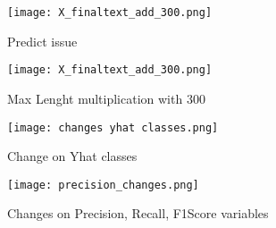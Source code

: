 \begin{figure}[H]
    \centering
    \texttt{[image: X\_finaltext\_add\_300.png]}
    \caption{Predict issue}
    \label{fig:error_dimentionality}
\end{figure}

\begin{figure}[H]
    \centering
    \texttt{[image: X\_finaltext\_add\_300.png]}
    \caption{Max Lenght multiplication with 300}
    \label{fig:max_lenght_muliplication}
\end{figure}

\begin{figure}[H]
    \centering
    \texttt{[image: changes yhat classes.png]}
    \caption{Change on Yhat classes}
    \label{fig:yhat_changes}
\end{figure}

\begin{figure}[H]
    \centering
    \texttt{[image: precision\_changes.png]}
    \caption{Changes on Precision, Recall, F1Score variables}
    \label{fig:precision_changes}
\end{figure}


